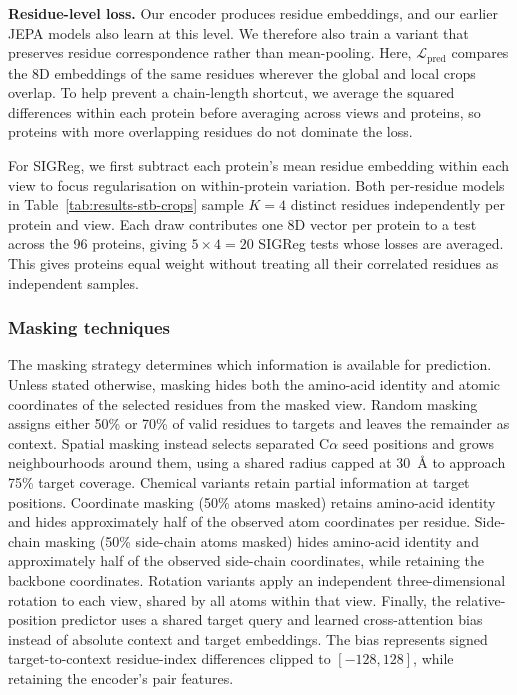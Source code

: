 \textbf{Residue-level loss.} Our encoder produces residue embeddings, and our earlier JEPA models also learn at this level. We therefore also train a variant that preserves residue correspondence rather than mean-pooling. Here, $\mathcal{L}_{\mathrm{pred}}$ compares the 8D embeddings of the same residues wherever the global and local crops overlap. To help prevent a chain-length shortcut, we average the squared differences within each protein before averaging across views and proteins, so proteins with more overlapping residues do not dominate the loss.

For SIGReg, we first subtract each protein's mean residue embedding within each view to focus regularisation on within-protein variation. Both per-residue models in Table~\ref{tab:results-stb-crops} sample $K=4$ distinct residues independently per protein and view. Each draw contributes one 8D vector per protein to a test across the 96 proteins, giving $5\times4=20$ SIGReg tests whose losses are averaged. This gives proteins equal weight without treating all their correlated residues as independent samples.

\subsubsection{Masking techniques}
\label{sec:methods-views}

The masking strategy determines which information is available for prediction. 
Unless stated otherwise, masking hides both the amino-acid identity and atomic coordinates of the selected residues from the masked view.
Random masking assigns either 50\% or 70\% of valid residues to targets and leaves the remainder as context. Spatial masking instead selects separated C$\alpha$ seed positions and grows neighbourhoods around them, using a shared radius capped at 30~\AA{} to approach 75\% target coverage. 
Chemical variants retain partial information at target positions. Coordinate masking (50\% atoms masked) retains amino-acid identity and hides approximately half of the observed atom coordinates per residue. Side-chain masking (50\% side-chain atoms masked) hides amino-acid identity and approximately half of the observed side-chain coordinates, while retaining the backbone coordinates.
Rotation variants apply an independent three-dimensional rotation to each view, shared by all atoms within that view. 
Finally, the relative-position predictor uses a shared target query and learned cross-attention bias instead of absolute context and target embeddings. The bias represents signed target-to-context residue-index differences clipped to $[-128,128]$, while retaining the encoder's pair features.

